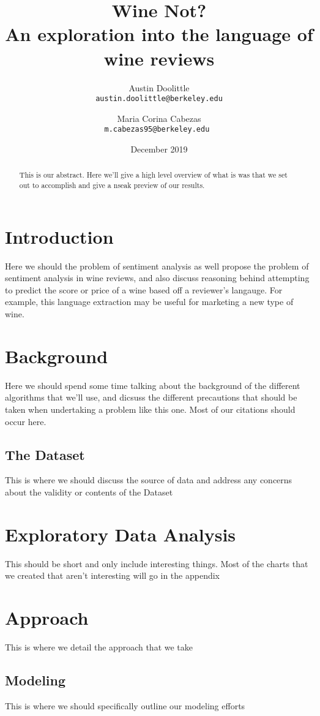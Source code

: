 \documentclass[11pt,english]{article}
\title{
    Wine Not? \\
    \large An exploration into the language of wine reviews
}
\author{
    Austin Doolittle \\
    \texttt{austin.doolittle@berkeley.edu}
    \and
    Maria Corina Cabezas \\
    \texttt{m.cabezas95@berkeley.edu }
}
\date{December 2019}
\begin{document}
\maketitle
\begin{abstract}
    This is our abstract. Here we'll give a high level overview of what is was that we set out to accomplish and give a nseak preview of our results.
\end{abstract}

\section{Introduction}
    Here we should the problem of sentiment analysis as well propose the problem of sentiment analysis in wine reviews, and also discuss reasoning behind attempting to predict the score or price of a wine based off a reviewer's langauge. For example, this language extraction may be useful for marketing a new type of wine.

\section{Background}
    Here we should spend some time talking about the background of the different algorithms that we'll use, and dicsuss the different precautions that should be taken when undertaking a problem like this one. Most of our citations should occur here.

\subsection{The Dataset}
    This is where we should discuss the source of data and address any concerns about the validity or contents of the Dataset

\section{Exploratory Data Analysis}
    This should be short and only include interesting things. Most of the charts that we created that aren't interesting will go in the appendix

\section{Approach}
    This is where we detail the approach that we take

\subsection{Modeling}
    This is where we should specifically outline our modeling efforts
\end{document}
